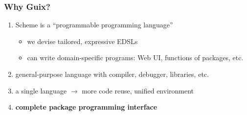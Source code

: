 \documentclass{beamer}
\begin{document}
\begin{frame}[fragile]

\end{frame}

\begin{frame}[fragile]
  \frametitle{Why Guix?}

  \Large{
    \begin{enumerate}
    \item{Scheme is a ``programmable programming language''
      \begin{itemize}
      \item we devise tailored, expressive \alert{EDSLs}
      \item can write domain-specific programs: Web UI, functions of
        packages, etc.
      \end{itemize}}
    \item \alert{general-purpose language} with compiler, debugger,
      libraries, etc.
    \item \alert{a single language} $\rightarrow$ more code reuse,
      unified environment
    \item \alert{\textbf{complete package programming interface}}
    \end{enumerate}
  }
\end{frame}
\end{document}

